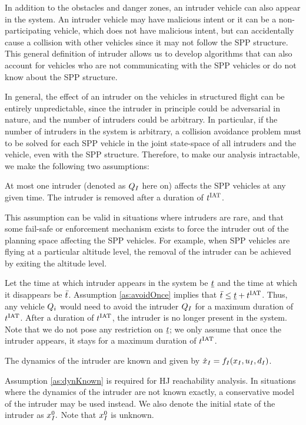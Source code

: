 In addition to the obstacles and danger zones, an intruder vehicle can also appear in the system. An intruder vehicle may have malicious intent or it can be a non-participating vehicle, which does not have malicious intent, but can accidentally cause a collision with other vehicles since it may not follow the SPP structure. This general definition of intruder allows us to develop algorithms that can also account for vehicles who are not communicating with the SPP vehicles or do not know about the SPP structure. 

In general, the effect of an intruder on the vehicles in structured flight can be entirely unpredictable, since the intruder in principle could be adversarial in nature, and the number of intruders could be arbitrary. In particular, if the number of intruders in the system is arbitrary, a collision avoidance problem must to be solved for each SPP vehicle in the joint state-space of all intruders and the vehicle, even with the SPP structure. Therefore, to make our analysis intractable, we make the following two assumptions: 
\begin{assumption}
\label{as:avoidOnce}
At most one intruder (denoted as $Q_I$ here on) affects the SPP vehicles at any given time. The intruder is removed after a duration of $t^\text{IAT}$. 
\end{assumption}    
This assumption can be valid in situations where intruders are rare, and that some fail-safe or enforcement mechanism exists to force the intruder out of the planning space affecting the SPP vehicles. For example, when SPP vehicles are flying at a particular altitude level, the removal of the intruder can be achieved by exiting the altitude level.
 
Let the time at which intruder appears in the system be $\underline{t}$ and the time at which it disappears be $\bar{t}$. Assumption \ref{as:avoidOnce} implies that $\bar{t} \leq \underline{t} + t^\text{IAT}$. Thus, any vehicle $Q_i$ would need to avoid the intruder $Q_{I}$ for a maximum duration of $t^\text{IAT}$. After a duration of $t^\text{IAT}$, the intruder is no longer present in the system. Note that we do not pose any restriction on $\underline{t}$; we only assume that once the intruder appears, it stays for a maximum duration of $t^\text{IAT}$.
\begin{assumption}
\label{as:dynKnown}
The dynamics of the intruder are known and given by $\dot{x}_I = f_I(x_I, u_I, d_I)$.
\end{assumption}
Assumption \ref{as:dynKnown} is required for HJ reachability analysis. In situations where the dynamics of the intruder are not known exactly, a conservative model of the intruder may be used instead. We also denote the initial state of the intruder as $x_{I}^0.$ Note that $x_{I}^0$ is unknown.

